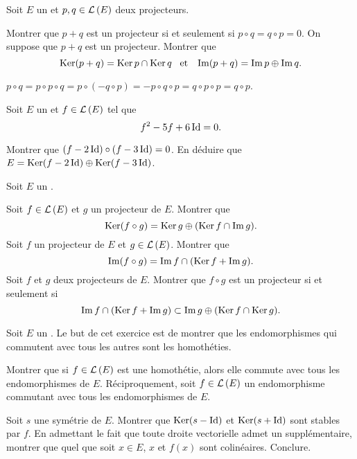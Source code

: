 \documentclass{magnolia}
\begin{document}

Soit $E$ un \Kev et $p,q\in\mathcal{L}\left(E\right)$ deux projecteurs.
\begin{questions}
\question Montrer que $p+q$ est un projecteur si et seulement si
  $p\circ q=q\circ p=0$.
\question On suppose que $p+q$ est un projecteur. Montrer que
  \[\mathop{\rm Ker}(p+q)=\mathop{\rm Ker} p\cap\mathop{\rm Ker} q \quad\!\text{et}\quad\! \operatorname{Im}(p+q)=\operatorname{Im} p\oplus\operatorname{Im} q.\]
\end{questions}

\begin{sol}
$p\circ q=p\circ p\circ q=p\circ(-q\circ p)=-p\circ q\circ p=q\circ p\circ p=q\circ p$.
\end{sol}


Soit $E$ un \Kev et $f\in\mathcal{L}\left(E\right)$ tel que
\[f^2-5f+6\operatorname{Id}=0.\]
\begin{questions}
\question Montrer que $(f-2\operatorname{Id})\circ(f-3\operatorname{Id})=0$.
\question En déduire que $E=\mathop{\rm Ker} (f-2\operatorname{Id})\oplus\mathop{\rm Ker} (f-3\operatorname{Id})$.
\end{questions}

Soit $E$ un \Kev.
\begin{questions}
\question Soit $f\in\mathcal{L}\left(E\right)$ et $g$ un projecteur de $E$. Montrer que
  \[\mathop{\rm Ker}(f\circ g)=\mathop{\rm Ker} g \oplus (\mathop{\rm Ker} f\cap\operatorname{Im} g).\]
\question Soit $f$ un projecteur de $E$ et $g\in\mathcal{L}\left(E\right)$. Montrer que
  \[\operatorname{Im}(f\circ g)=\operatorname{Im} f \cap (\mathop{\rm Ker} f + \operatorname{Im} g).\]
\question Soit $f$ et $g$ deux projecteurs de $E$. Montrer que $f\circ g$ est
  un projecteur si et seulement si
  \[\operatorname{Im} f \cap (\mathop{\rm Ker} f + \operatorname{Im} g)\subset \operatorname{Im} g \oplus (\mathop{\rm Ker} f \cap \mathop{\rm Ker} g).\]
\end{questions}



Soit $E$ un \Kev. Le but de cet exercice est de montrer que les endomorphismes qui commutent avec tous les
autres sont les homothéties.
\begin{questions}
\question Montrer que si $f\in\mathcal{L}\left(E\right)$ est une homothétie, alors elle commute avec tous les
  endomorphismes de $E$.
\question Réciproquement, soit $f\in\mathcal{L}\left(E\right)$ un endomorphisme commutant avec tous les endomorphismes
  de $E$.
  \begin{questions}
  \question Soit $s$ une symétrie de $E$. Montrer que $\mathop{\rm Ker}(s-\operatorname{Id})$ et $\mathop{\rm Ker}(s+\operatorname{Id})$ sont stables par $f$.
  \question En admettant le fait que toute droite vectorielle admet un supplémentaire, montrer que
    quel que soit $x\in E$, $x$ et $f(x)$ sont colinéaires.
  \question Conclure.
  \end{questions}
\end{questions}
\end{document}
